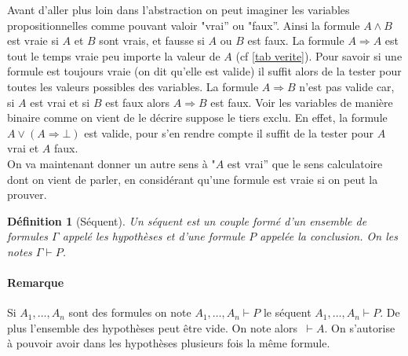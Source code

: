 \documentclass[a4paper,12pt]{article}
\theoremstyle{plain}
\newtheorem{defi}[theo]{Définition}
\begin{document}
Avant d'aller plus loin dans l'abstraction on peut imaginer les variables propositionnelles comme pouvant valoir "vrai'' ou "faux''. Ainsi la formule $A \land B$ est vraie si $A$ et $B$ sont vrais, et fausse si $A$ ou $B$ est faux. La formule $A \Rightarrow A$ est tout le temps vraie peu importe la valeur de $A$ (cf \ref{tab verite}). Pour savoir si une formule est toujours vraie (on dit qu'elle est valide) il suffit alors de la tester pour toutes les valeurs possibles des variables. La formule $A \Rightarrow B$ n'est pas valide car, si $A$ est vrai et si $B$ est faux alors $A \Rightarrow B$ est faux. Voir les variables de manière binaire comme on vient de le décrire suppose le tiers exclu. En effet, la formule $A \lor (A \Rightarrow\bot)$ est valide, pour s'en rendre compte il suffit de la tester pour $A$ vrai et $A$ faux.\\ 

On va maintenant donner un autre sens à "$A$ est vrai'' que le sens calculatoire dont on vient de parler, en considérant qu'une formule est vraie si on peut la prouver.

\begin{defi}[Séquent]
Un séquent est un couple formé d'un ensemble de formules $\Gamma$ appelé les hypothèses et d'une formule $P$ appelée la conclusion. On les notes $ \Gamma \vdash P$.
\label{sequent}
\end{defi}

\paragraph{Remarque}

Si $A_1, \dots, A_n$ sont des formules on note $A_1, \dots, A_n \vdash P$ le séquent ${A_1, \dots, A_n} \vdash P$. De plus l'ensemble des hypothèses peut être vide. On note alors $ ~ \vdash A $. On s'autorise à pouvoir avoir dans les hypothèses plusieurs fois la même formule.
\end{document}
